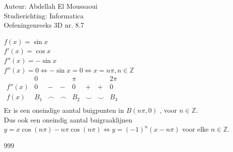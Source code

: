\documentclass[a4paper]{article}
\begin{document}
  
\noindent \large Auteur: Abdellah El Moussaoui \\
\noindent \large Studierichting: Informatica\\
\noindent \large Oefeningenreeks 3D nr. 8.7\\

\medskip

\normalsize

$f(x)=\sin x$\\

$f'(x)=\cos x$\\

$f''(x)=-\sin x$\\

$f''(x)=0 \Leftrightarrow -\sin x=0 \Leftrightarrow x=n\pi, n\in \mathbb{Z}$\\


$\begin{array}{r|ccccccc}
           & 0 &        &    &   \pi  &    &      & 2\pi \\
    \hline  
    f''(x) &  0 & -      & -   & 0      & +   & +      &   0      \\
    f(x)   &   B_1     & \frown & \frown & B_2 & \smile & \smile &   B_3     \\
\end{array}$ \\

Er is een oneindige aantal buigpunten  in $B(n\pi,0)$ , voor $n\in \mathbb{Z}$.\\

Dus ook een oneindig aantal buigraaklijnen $y=x\cos\left(n\pi\right)-n\pi\cos\left(n\pi\right) \Leftrightarrow y=\left(-1\right)^n\left(x-n\pi\right)$ voor elke $n\in\mathbb{Z}.$\\

\begin{thebibliography}{999}
\end{thebibliography}
\end{document}
